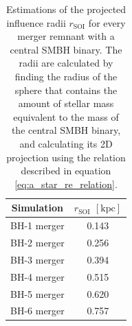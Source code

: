 \documentclass[english, oneside]{HYgradu}
\begin{document}
\begin{table}
	\begin{center}
		\begin{tabular}{| c | c |}
		\hline
		Simulation & $r_\mathrm{SOI}$ $\mathrm{[kpc]}$ \\
		\hline
		BH-1 merger & 0.143 \\
		BH-2 merger & 0.256 \\
		BH-3 merger & 0.394 \\
		BH-4 merger & 0.515 \\
		BH-5 merger & 0.620 \\
		BH-6 merger & 0.757 \\
		\hline
		\end{tabular}
	\end{center}
	\caption{Estimations of the projected influence radii $r_\mathrm{SOI}$ for every merger remnant with a central SMBH binary. The radii are calculated by finding the radius of the sphere that contains the amount of stellar mass equivalent to the mass of the central SMBH binary, and calculating its 2D projection using the relation described in equation \ref{eq:a_star_re_relation}.}
	\label{table:s-o-i}
\end{table}


\end{document}

